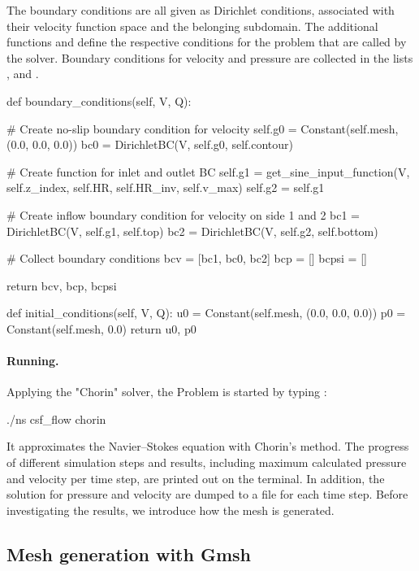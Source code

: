 The boundary conditions are all given as Dirichlet conditions,
associated with their velocity function space and the belonging
subdomain. The additional functions  and
 define the respective conditions for the problem
that are called by the solver. Boundary conditions for velocity and
pressure are collected in the lists ,  and .
\begin{python}
def boundary_conditions(self, V, Q):

    # Create no-slip boundary condition for velocity
    self.g0 = Constant(self.mesh, (0.0, 0.0, 0.0))
    bc0 = DirichletBC(V, self.g0, self.contour)

    # Create function for inlet and outlet BC
    self.g1 = get_sine_input_function(V, self.z_index, self.HR, self.HR_inv,
                                      self.v_max)
    self.g2 = self.g1

    # Create inflow boundary condition for velocity on side 1 and 2
    bc1 = DirichletBC(V, self.g1, self.top)
    bc2 = DirichletBC(V, self.g2, self.bottom)

    # Collect boundary conditions
    bcv = [bc1, bc0, bc2]
    bcp = []
    bcpsi = []

    return bcv, bcp, bcpsi

def initial_conditions(self, V, Q):
    u0 = Constant(self.mesh, (0.0, 0.0, 0.0))
    p0 = Constant(self.mesh, 0.0)
    return u0, p0
\end{python}

\paragraph{Running.}
Applying the "Chorin" solver, the Problem is started by typing :
\begin{bash}
./ns csf_flow chorin
\end{bash}

It approximates the Navier--Stokes equation with Chorin's method. The
progress of different simulation steps and results, including maximum
calculated pressure and velocity per time step, are printed out on the
terminal. In addition, the solution for pressure and velocity are
dumped to a file for each time step. Before investigating the results,
we introduce how the mesh is generated.

\subsection{Mesh generation with Gmsh}

